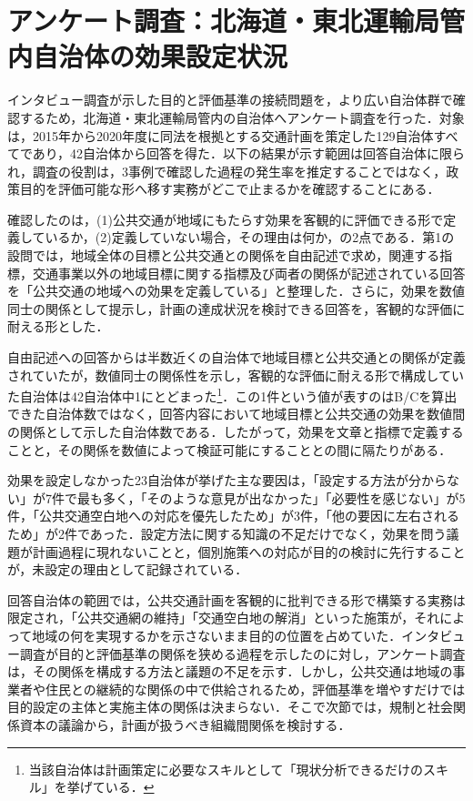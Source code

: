 \section{アンケート調査：北海道・東北運輸局管内自治体の効果設定状況}
\label{sec:ch5_survey}

インタビュー調査が示した目的と評価基準の接続問題を，より広い自治体群で確認するため，北海道・東北運輸局管内の自治体へアンケート調査を行った．対象は，2015年から2020年度に同法を根拠とする交通計画を策定した129自治体すべてであり，42自治体から回答を得た．以下の結果が示す範囲は回答自治体に限られ，調査の役割は，3事例で確認した過程の発生率を推定することではなく，政策目的を評価可能な形へ移す実務がどこで止まるかを確認することにある．

確認したのは，(1)公共交通が地域にもたらす効果を客観的に評価できる形で定義しているか，(2)定義していない場合，その理由は何か，の2点である．第1の設問では，地域全体の目標と公共交通との関係を自由記述で求め，関連する指標，交通事業以外の地域目標に関する指標及び両者の関係が記述されている回答を「公共交通の地域への効果を定義している」と整理した．さらに，効果を数値同士の関係として提示し，計画の達成状況を検討できる回答を，客観的な評価に耐える形とした．

自由記述への回答からは半数近くの自治体で地域目標と公共交通との関係が定義されていたが，数値同士の関係性を示し，客観的な評価に耐える形で構成していた自治体は42自治体中1にとどまった\footnote{当該自治体は計画策定に必要なスキルとして「現状分析できるだけのスキル」を挙げている．}．この1件という値が表すのはB/Cを算出できた自治体数ではなく，回答内容において地域目標と公共交通の効果を数値間の関係として示した自治体数である．したがって，効果を文章と指標で定義することと，その関係を数値によって検証可能にすることとの間に隔たりがある．

効果を設定しなかった23自治体が挙げた主な要因は，「設定する方法が分からない」が7件で最も多く，「そのような意見が出なかった」「必要性を感じない」が5件，「公共交通空白地への対応を優先したため」が3件，「他の要因に左右されるため」が2件であった．設定方法に関する知識の不足だけでなく，効果を問う議題が計画過程に現れないことと，個別施策への対応が目的の検討に先行することが，未設定の理由として記録されている．

回答自治体の範囲では，公共交通計画を客観的に批判できる形で構築する実務は限定され，「公共交通網の維持」「交通空白地の解消」といった施策が，それによって地域の何を実現するかを示さないまま目的の位置を占めていた．インタビュー調査が目的と評価基準の関係を狭める過程を示したのに対し，アンケート調査は，その関係を構成する方法と議題の不足を示す．しかし，公共交通は地域の事業者や住民との継続的な関係の中で供給されるため，評価基準を増やすだけでは目的設定の主体と実施主体の関係は決まらない．そこで次節では，規制と社会関係資本の議論から，計画が扱うべき組織間関係を検討する．

